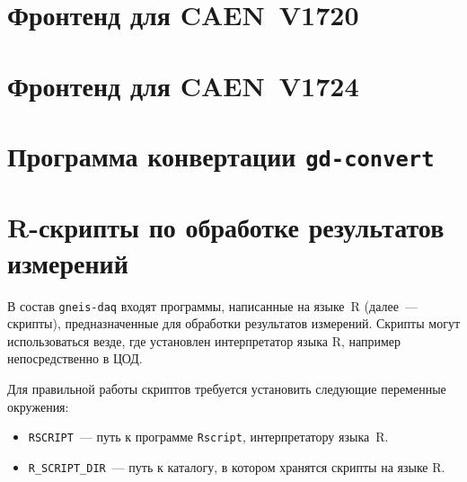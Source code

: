 \documentclass[12pt, a4paper, oneside, onecolumn]{book}
\newcommand{\GD}{{\tt gneis-daq}}
\newcommand{\APP}[1]{\mbox{\tt #1}}
\newcommand{\COMMAND}[1]{{\tt #1}}
\newcommand{\ENVVAR}[1]{{\tt #1}}
\begin{document}

\newcommand{\FE}{\APP{fe-v1720}}
\newcommand{\DEVICE}{CAEN~V1720}

\chapter{Фронтенд для \DEVICE{}}
\label{sec-fe-v1720}




\renewcommand{\FE}{\APP{fe-v1724}}
\renewcommand{\DEVICE}{CAEN~V1724}

\chapter{Фронтенд для \DEVICE{}}




\newcommand{\GDCONVERT}{\APP{gd-convert}}

\chapter{Программа конвертации \GDCONVERT}




\chapter{R-скрипты по обработке результатов измерений}

В состав \GD{} входят программы, написанные на языке~R \cite{RLang} (далее~--- скрипты), предназначенные для обработки результатов измерений. Скрипты могут использоваться везде, где установлен интерпретатор языка R, например непосредственно в ЦОД.

Для правильной работы скриптов требуется установить следующие переменные окружения:

\begin{itemize}

\item \ENVVAR{RSCRIPT}~--- путь к программе \COMMAND{Rscript}, интерпретатору языка~R.

\item \ENVVAR{R\_SCRIPT\_DIR}~--- путь к каталогу, в котором хранятся скрипты на языке R.

\end{itemize}
\end{document}
